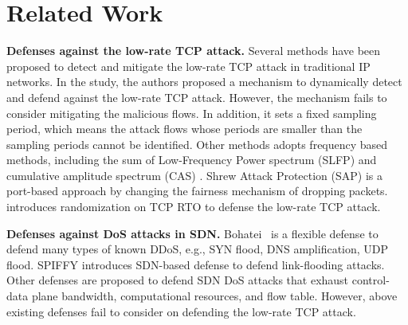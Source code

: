 \section{Related Work}

\noindent \textbf{Defenses against the low-rate TCP attack.} Several methods have been proposed to detect and mitigate the low-rate TCP attack in traditional IP networks. In the study\cite{b4}, the authors proposed a mechanism to dynamically detect and defend against the low-rate TCP attack. However, the mechanism fails to consider mitigating the malicious flows. In addition, it sets a fixed sampling period, which means the attack flows whose periods are smaller than the sampling periods cannot be identified. 
Other methods adopts frequency based methods, including the sum of Low-Frequency Power spectrum (SLFP) \cite{b6} and cumulative amplitude spectrum (CAS) \cite{b7}. Shrew Attack Protection (SAP) \cite{b8} is a port-based approach by changing the fairness mechanism of dropping packets. \cite{b17} introduces randomization on TCP RTO to defense the low-rate TCP attack. 


\noindent \textbf{Defenses against DoS attacks in SDN.} Bohatei~\cite{b9} is a flexible defense to defend many types of known DDoS, e.g., SYN flood, DNS amplification, UDP flood. %
SPIFFY \cite{b16} introduces SDN-based defense to defend link-flooding attacks. 
Other defenses \cite{b10, b12, b13, b15, b18} are proposed to defend SDN DoS attacks that exhaust control-data plane bandwidth, computational resources, and flow table. However, above existing defenses fail to consider on defending the low-rate TCP attack. 



